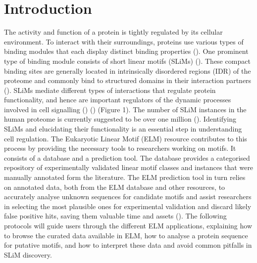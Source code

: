 \section{Introduction}\label{introduction}

The activity and function of a protein is tightly regulated by its
cellular environment. To interact with their surroundings, proteins use
various types of binding modules that each display distinct binding
properties (\cite{10550212}). One prominent type of binding module
consists of short linear motifs (SLiMs) (\cite{18508681}). These compact
binding sites are generally located in intrinsically disordered regions
(IDR) of the proteome and commonly bind to structured domains in their
interaction partners (\cite{21909575}). SLiMs mediate different types of
interactions that regulate protein functionality, and hence are
important regulators of the dynamic processes involved in cell
signalling (\cite{22480932}) (\cite{24926813}) (Figure 1). The number of
SLiM instances in the human proteome is currently suggested to be over
one million (\cite{25038412}). Identifying SLiMs and elucidating their
functionality is an essential step in understanding cell regulation. The
Eukaryotic Linear Motif (ELM) resource contributes to this process by
providing the necessary tools to researchers working on motifs. It
consists of a database and a prediction tool. The database provides a
categorised repository of experimentally validated linear motif classes
and instances that were manually annotated form the literature. The ELM
prediction tool in turn relies on annotated data, both from the ELM
database and other resources, to accurately analyse unknown sequences
for candidate motifs and assist researchers in selecting the most
plausible ones for experimental validation and discard likely false
positive hits, saving them valuable time and assets (\cite{22110040}).
The following protocols will guide users through the different ELM
applications, explaining how to browse the curated data available in
ELM, how to analyse a protein sequence for putative motifs, and how to
interpret these data and avoid common pitfalls in SLiM discovery.

